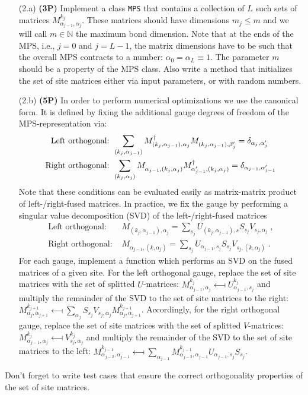 \documentclass[a4paper, 12pt]{article}
\newcommand{\nodagger}{{\vphantom{\dagger}}}
\begin{document}
\begin{itemize}
	\item[(2.a)] \textbf{(3P)}
	Implement a class \texttt{MPS} that contains a collection of $L$ such sets of matrices $M^{k_j}_{\alpha_{j-1}, \alpha_{j}}$.
	These matrices should have dimensions $m_j \leq m$ and we will call $m\in\mathbb N$ the maximum bond dimension.
	Note that at the ends of the MPS, i.e., $j=0$ and $j=L-1$, the matrix dimensions have to be such that the overall MPS contracts to a number: $\alpha_0 = \alpha_L \equiv 1$.
	The parameter $m$ should be a property of the MPS class.
	Also write a method that initializes the set of site matrices either via input parameters, or with random numbers.
	\item[(2.b)] \textbf{(5P)}
	In order to perform numerical optimizations we use the canonical form.
	It is defined by fixing the additional gauge degrees of freedom of the MPS-representation via:
	\begin{align}
		\text{Left orthogonal: } &\sum_{(k_j,\alpha_{j-1})} M^\dagger_{(k_j,\alpha_{j-1}),\alpha_j} M^\nodagger_{(k_j,\alpha_{j-1}),\beta^\prime_j} = \delta_{\alpha_j,\alpha^\prime_j} \\
		\text{Right orthogonal: } &\sum_{(k_j,\alpha_{j})} M^\nodagger_{\alpha_{j-1},(k_j,\alpha_j)} M^\dagger_{\alpha^\prime_{j-1},(k_j,\alpha_j)} = \delta_{\alpha_{j-1},\alpha^\prime_{j-1}}
	\end{align}
	Note that these conditions can be evaluated easily as matrix-matrix product of left-/right-fused matrices.
	In practice, we fix the gauge by performing a singular value decomposition (SVD) of the left-/right-fused matrices
	\begin{align}
		\text{Left orthogonal: } &M_{(k_j,\alpha_{j-1}),\alpha_j} = \sum_{s_j} U_{(k_j,\alpha_{j-1}),s} S_{s_j} V_{s_j,\alpha_j} \;, \\
		\text{Right orthogonal: } &M_{\alpha_{j-1},(k,\alpha_j)} = \sum_{s_j} U_{\alpha_{j-1},s_j} S_{s_j} V_{s_j,(k,\alpha_j)} \;.
	\end{align}
	For each gauge, implement a function which performs an SVD on the fused matrices of a given site.
	For the left orthogonal gauge, replace the set of site matrices with the set of splitted $U$-matrices: $M^{k_j}_{\alpha_{j-1},\alpha_j} \longmapsfrom U^{k_j}_{\alpha_{j-1},s_j}$ and multiply the remainder of the SVD to the set of site matrices to the right: $M^{k_{j+1}}_{\alpha_j,\alpha_{j+1}} \longmapsfrom \sum_{\alpha_{j}} S_{s_j} V_{s_j,\alpha_j} M^{k_{j+1}}_{\alpha_j,\alpha_{j+1}}$.
	Accordingly, for the right orthogonal gauge, replace the set of site matrices with the set of splitted $V$-matrices: $M^{k_j}_{\alpha_{j-1},\alpha_j} \longmapsfrom V^{k_j}_{s_j, \alpha_{j}}$ and multiply the remainder of the SVD to the set of site matrices to the left: $M^{k_{j-1}}_{\alpha_{j-2},\alpha_{j-1}} \longmapsfrom \sum_{\alpha_{j-1}} M^{k_{j-1}}_{\alpha_{j-2},\alpha_{j-1}} U_{\alpha_{j-1},s_j} S_{s_j}$.
\end{itemize}
%
Don't forget to write test cases that ensure the correct orthogonality properties of the set of site matrices.
%
\end{document}
